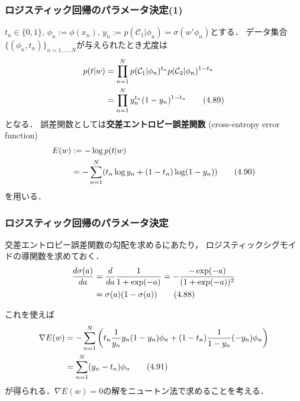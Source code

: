 \documentclass[10pt,%
hyperref={unicode}]{beamer}
\begin{document}
\begin{frame}
    \frametitle{ロジスティック回帰のパラメータ決定(1)}
    $t_n \in \{0,1\},\,\phi_n%
    := \phi(x_n),\,y_n := p(\mathcal{C}_1|\phi_n) = \sigma(w'\phi_n)$とする．
    データ集合$\{(\phi_n,t_n)\}_{n = 1,\ldots,N}$が与えられたとき尤度は
    \begin{align}
        p(t|w) &= \prod_{n = 1}^N p(\mathcal{C}_1|\phi_n)^{t_n}
                                  p(\mathcal{C}_2|\phi_n)^{1 - t_n} \notag \\
               &= \prod_{n = 1}^N y_n^{t_n} (1 - y_n)^{1 - t_n} \tag{4.89} \label{ptw}
    \end{align}
    となる．
    誤差関数としては\textbf{交差エントロピー誤差関数}
    (cross-entropy error function)
    \begin{align}
        E(w) &:= - \log p(t|w) \notag \\
             &= -\sum_{n = 1}^N (t_n \log y_n + (1 - t_n) \log (1 - y_n))
        \tag{4.90}
    \end{align}
    を用いる．
\end{frame}

\begin{frame}
    \frametitle{ロジスティック回帰のパラメータ決定}
    交差エントロピー誤差関数の勾配を求めるにあたり，
    ロジスティックシグモイドの導関数を求めておく．
    \begin{align}
        \frac{d\sigma(a)}{da} &= \frac{d}{da}\frac{1}{1 + \exp(-a)}
                           = -\frac{-\exp (-a)}{(1 + \exp(-a))^2} \notag \\
                           &= \sigma(a) (1 - \sigma(a)) \tag{4.88}
    \end{align}

    これを使えば
    \begin{align}
        \nabla E(w) &= -\sum_{n = 1}^N
                        \left(t_n \frac{1}{y_n} y_n (1 - y_n)\phi_n
                        + (1 - t_n) \frac{1}{1 - y_n}(-y_n)\phi_n\right) \notag \\
                    &= \sum_{n = 1}^N (y_n - t_n) \phi_n \tag{4.91}
    \end{align}
    が得られる．$\nabla E(w) = 0$の解をニュートン法で求めることを考える．
\end{frame}
\end{document}
